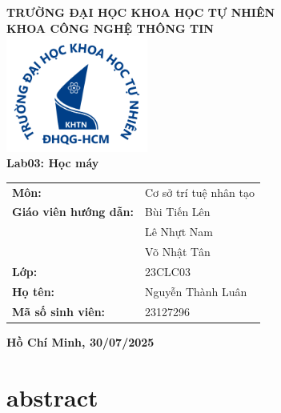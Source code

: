 \documentclass[12pt, a4paper]{article}
\begin{document}
\begin{titlepage}
    \centering
    \fontsize{16pt}{18pt}\selectfont
    \textbf{TRƯỜNG ĐẠI HỌC KHOA HỌC TỰ NHIÊN} \\
    \textbf{KHOA CÔNG NGHỆ THÔNG TIN} \\[1cm]

    \includegraphics[width=0.35\textwidth]{img/logohcmus.png} \\[1cm]

    {\fontsize{24pt}{26pt}\selectfont \textbf{Lab03: Học máy}} \\[1cm]

    \vspace{0.5cm}

    \begin{center}
        \renewcommand{\arraystretch}{1.2}
        \begin{tabular}{@{}ll}
            \textbf{Môn:} & Cơ sở trí tuệ nhân tạo \\[13pt]
            \textbf{Giáo viên hướng dẫn:} & Bùi Tiến Lên \\ 
                                          & Lê Nhựt Nam \\
                                          & Võ Nhật Tân\\[13pt]
            \textbf{Lớp:} & 23CLC03 \\[13pt]
            \textbf{Họ tên:} & Nguyễn Thành Luân \\[13pt]
            \textbf{Mã số sinh viên:} & 23127296 \\[13pt]
        \end{tabular}
    \end{center}

    \vfill

    {\Large \textbf{Hồ Chí Minh, 30/07/2025}}

\end{titlepage}


\tableofcontents  
\newpage         
\section{abstract}
\end{document}
